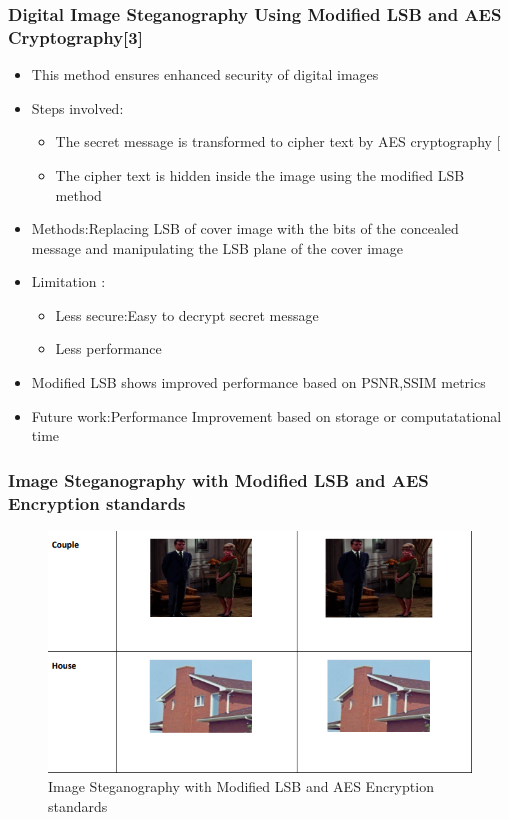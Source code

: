 \documentclass{beamer} %
\theoremstyle{definition} %
\begin{document}
\begin{frame}
\frametitle{Digital Image Steganography Using Modified LSB and AES Cryptography[3]   }
\begin{itemize}
	\item{ This method ensures enhanced security of digital images  }
	\item {Steps involved:}
	\begin{itemize}
	\item{The secret message is transformed to cipher text by AES cryptography [ }
	\item{ The cipher text is hidden inside the image using the modified LSB method }
	\end{itemize}
	\item{Methods:Replacing LSB of cover image with the bits of the concealed message and manipulating the LSB plane of the cover image  }
	\item{Limitation :}
	\begin{itemize}
		\item {Less secure:Easy to decrypt secret message  }
		\item {Less performance  }
	\end{itemize}
	\item{Modified LSB shows improved performance based on PSNR,SSIM metrics  } 
	\item{Future work:Performance Improvement based on storage or computatational time}
\end{itemize}
\end{frame}

\begin{frame}
 \frametitle{Image Steganography with Modified LSB and AES Encryption standards}
	\begin{figure}
		\includegraphics[scale=0.45]{modifiedLSB.png}
		\caption{Image Steganography with Modified LSB and AES Encryption standards}
	\end{figure}
\end{frame}
\end{document}
